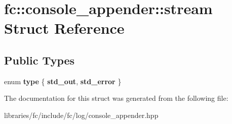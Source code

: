 \hypertarget{structfc_1_1console__appender_1_1stream}{}\section{fc\+:\+:console\+\_\+appender\+:\+:stream Struct Reference}
\label{structfc_1_1console__appender_1_1stream}
\subsection*{Public Types}
\begin{DoxyCompactItemize}
\item 
\mbox{\label{structfc_1_1console__appender_1_1stream_aaf2f066b1d3019c7858383edc440cbf8}} 
enum {\bfseries type} \{ {\bfseries std\+\_\+out}, 
{\bfseries std\+\_\+error}
 \}
\end{DoxyCompactItemize}


The documentation for this struct was generated from the following file\+:\begin{DoxyCompactItemize}
\item 
libraries/fc/include/fc/log/console\+\_\+appender.\+hpp\end{DoxyCompactItemize}
